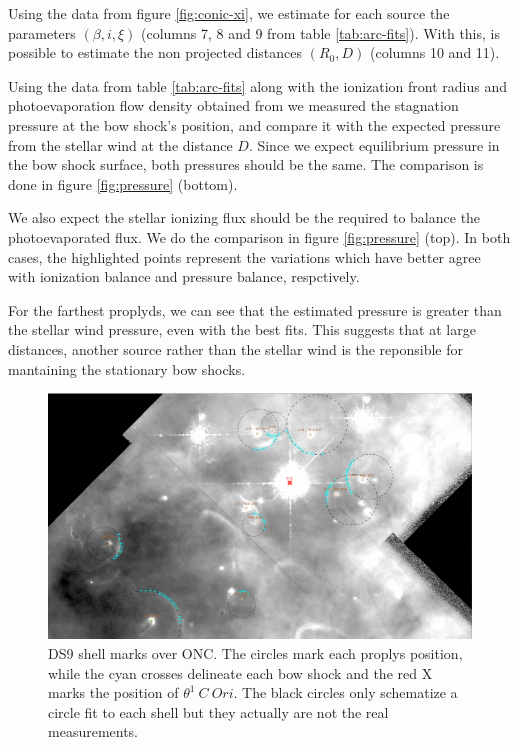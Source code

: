 Using the data from figure \ref{fig:conic-xi}, we estimate for each source the parameters $(\beta,i,\xi)$ (columns 7, 8 and 9 from table \ref{tab:arc-fits}). With this, is possible to estimate the non projected distances $(R_0,D)$ (columns 10 and 11).

Using the data from table \ref{tab:arc-fits} along with the ionization front radius and photoevaporation flow density obtained from \citet{HA:1998} we measured the stagnation pressure at the bow shock's position, 
and compare it with the expected pressure from the stellar wind at the distance $D$. Since we expect equilibrium pressure in the bow shock surface, both pressures should be the same. The comparison is done in figure \ref{fig:pressure} (bottom).

We also expect the stellar ionizing flux should be the required to balance the photoevaporated flux. We do
the comparison in figure \ref{fig:pressure} (top). In both cases, the highlighted points represent the variations which have better agree with ionization balance and pressure balance, respctively.
 
For the farthest proplyds, we can see that the estimated pressure is greater than the stellar wind pressure, even with the best fits. This suggests that at large distances, another source rather than the 
stellar wind is the reponsible for mantaining the stationary bow shocks. 

\begin{figure}
\includegraphics[width=\linewidth]{LV-full-field-annotated.png}
\caption{DS9 shell marks over ONC. The circles mark each proplys position, while the cyan crosses delineate each bow shock and the red X marks the position of $\theta^1 ~C~Ori$. 
The black circles only schematize a circle fit to each shell but they actually are not the real measurements.}
\label{fig:radii-measures-example}
\end{figure}


